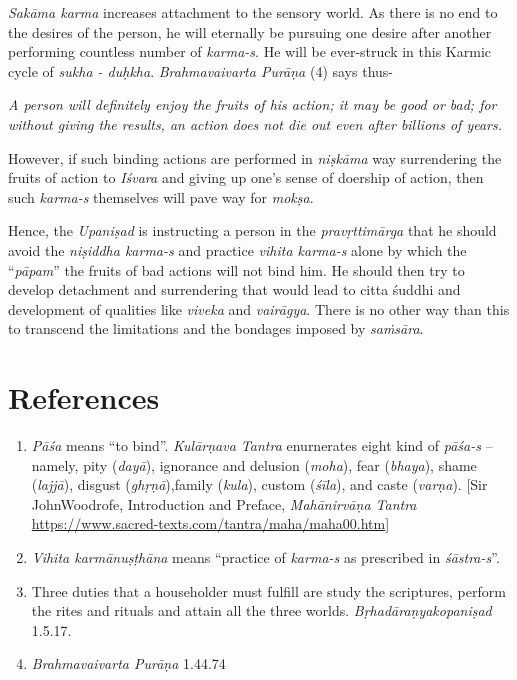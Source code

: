 \emph{Sakāma karma} increases attachment to the sensory world. As there is no end to the desires of the person, he will eternally be pursuing one desire after another performing countless number of \emph{karma-s}. He will be ever-struck in this Karmic cycle of \emph{sukha - duḥkha}. \emph{Brahmavaivarta Purāṇa} (4) says thus-

\emph{A person will definitely enjoy the fruits of his action; it may be good or bad; for without giving the results, an action does not die out even after billions of years.}

However, if such binding actions are performed in \emph{niṣkāma} way surrendering the fruits of action to \emph{Iśvara} and giving up one's sense of doership of action, then such \emph{karma-s} themselves will pave way for \emph{mokṣa}.

Hence, the \emph{Upaniṣad} is instructing a person in the \emph{pravṛttimārga} that he should avoid the \emph{niṣiddha karma-s} and practice \emph{vihita karma-s} alone by which the ``\emph{pāpam}'' the fruits of bad actions will not bind him. He should then try to develop detachment and surrendering that would lead to citta śuddhi and development of qualities like \emph{viveka} and \emph{vairāgya}. There is no other way than this to transcend the limitations and the bondages imposed by \emph{saṁsāra}.

\section*{References}

\begin{enumerate}
\itemsep=0pt
\item
  \emph{Pāśa} means ``to bind''. \emph{Kulārṇava Tantra} enurnerates eight kind of \emph{pāśa-s} -- namely, pity (\emph{dayā}), ignorance and delusion (\emph{moha}), fear (\emph{bhaya}), shame (\emph{lajjā}), disgust (\emph{ghṛṇā}),\break family (\emph{kula}), custom (\emph{śīla}), and caste (\emph{varṇa}). {[}Sir John\break Woodrofe, Introduction and Preface, \emph{Mahānirvāṇa Tantra} \url{https://www.sacred-texts.com/tantra/maha/maha00.htm}{]}
\item
  \emph{Vihita karmānuṣṭhāna} means ``practice of \emph{karma-s} as prescribed in \emph{śāstra-s}''.
\item
  Three duties that a householder must fulfill are study the scriptures, perform the rites and rituals and attain all the three worlds. \emph{Bṛhadāraṇyakopaniṣad} 1.5.17.
\item
  \emph{Brahmavaivarta Purāṇa} 1.44.74
\end{enumerate}
